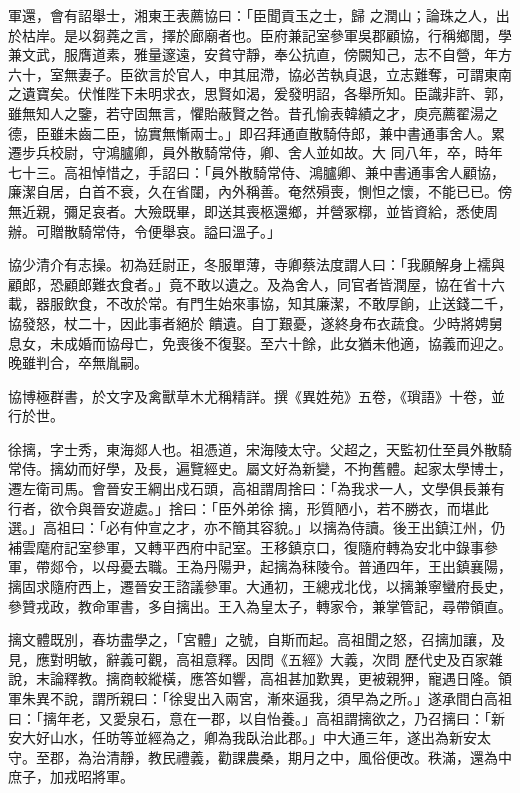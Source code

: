 \begin{pinyinscope}
 軍還，會有詔舉士，湘東王表薦協曰：「臣聞貢玉之士，歸
 之潤山；論珠之人，出於枯岸。是以芻蕘之言，擇於廊廟者也。臣府兼記室參軍吳郡顧協，行稱鄉閭，學兼文武，服膺道素，雅量邃遠，安貧守靜，奉公抗直，傍闕知己，志不自營，年方六十，室無妻子。臣欲言於官人，申其屈滯，協必苦執貞退，立志難奪，可謂東南之遺寶矣。伏惟陛下未明求衣，思賢如渴，爰發明詔，各舉所知。臣識非許、郭，雖無知人之鑒，若守固無言，懼貽蔽賢之咎。昔孔愉表韓績之才，庾亮薦翟湯之德，臣雖未齒二臣，協實無慚兩士。」即召拜通直散騎侍郎，兼中書通事舍人。累遷步兵校尉，守鴻臚卿，員外散騎常侍，卿、舍人並如故。大
 同八年，卒，時年七十三。高祖悼惜之，手詔曰：「員外散騎常侍、鴻臚卿、兼中書通事舍人顧協，廉潔自居，白首不衰，久在省闥，內外稱善。奄然殞喪，惻怛之懷，不能已已。傍無近親，彌足哀者。大殮既畢，即送其喪柩還鄉，并營冢槨，並皆資給，悉使周辦。可贈散騎常侍，令便舉哀。謚曰溫子。」



 協少清介有志操。初為廷尉正，冬服單薄，寺卿蔡法度謂人曰：「我願解身上襦與顧郎，恐顧郎難衣食者。」竟不敢以遺之。及為舍人，同官者皆潤屋，協在省十六載，器服飲食，不改於常。有門生始來事協，知其廉潔，不敢厚餉，止送錢二千，協發怒，杖二十，因此事者絕於
 饋遺。自丁艱憂，遂終身布衣蔬食。少時將娉舅息女，未成婚而協母亡，免喪後不復娶。至六十餘，此女猶未他適，協義而迎之。晚雖判合，卒無胤嗣。



 協博極群書，於文字及禽獸草木尤稱精詳。撰《異姓苑》五卷，《瑣語》十卷，並行於世。



 徐摛，字士秀，東海郯人也。祖憑道，宋海陵太守。父超之，天監初仕至員外散騎常侍。摛幼而好學，及長，遍覽經史。屬文好為新變，不拘舊體。起家太學博士，遷左衛司馬。會晉安王綱出戍石頭，高祖謂周捨曰：「為我求一人，文學俱長兼有行者，欲令與晉安遊處。」捨曰：「臣外弟徐
 摛，形質陋小，若不勝衣，而堪此選。」高祖曰：「必有仲宣之才，亦不簡其容貌。」以摛為侍讀。後王出鎮江州，仍補雲麾府記室參軍，又轉平西府中記室。王移鎮京口，復隨府轉為安北中錄事參軍，帶郯令，以母憂去職。王為丹陽尹，起摛為秣陵令。普通四年，王出鎮襄陽，摛固求隨府西上，遷晉安王諮議參軍。大通初，王總戎北伐，以摛兼寧蠻府長史，參贊戎政，教命軍書，多自摛出。王入為皇太子，轉家令，兼掌管記，尋帶領直。



 摛文體既別，春坊盡學之，「宮體」之號，自斯而起。高祖聞之怒，召摛加讓，及見，應對明敏，辭義可觀，高祖意釋。因問《五經》大義，次問
 歷代史及百家雜說，末論釋教。摛商較縱橫，應答如響，高祖甚加歎異，更被親狎，寵遇日隆。領軍朱異不說，謂所親曰：「徐叟出入兩宮，漸來逼我，須早為之所。」遂承間白高祖曰：「摛年老，又愛泉石，意在一郡，以自怡養。」高祖謂摛欲之，乃召摛曰：「新安大好山水，任昉等並經為之，卿為我臥治此郡。」中大通三年，遂出為新安太守。至郡，為治清靜，教民禮義，勸課農桑，期月之中，風俗便改。秩滿，還為中庶子，加戎昭將軍。




\end{pinyinscope}
